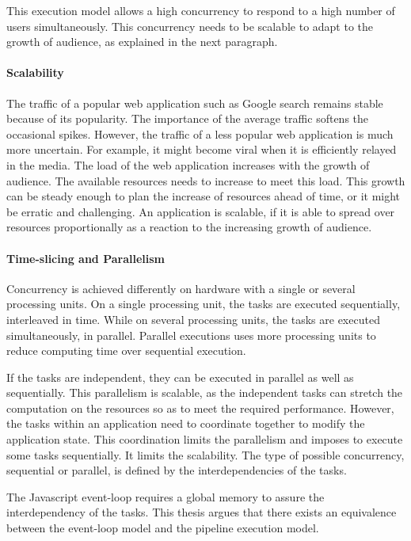 This execution model allows a high concurrency to respond to a high number of users simultaneously.
This concurrency needs to be scalable to adapt to the growth of audience, as explained in the next paragraph.

\paragraph{Scalability}

The traffic of a popular web application such as Google search remains stable because of its popularity.
The importance of the average traffic softens the occasional spikes.
However, the traffic of a less popular web application is much more uncertain.
For example, it might become viral when it is efficiently relayed in the media.
The load of the web application increases with the growth of audience.
The available resources needs to increase to meet this load.
This growth can be steady enough to plan the increase of resources ahead of time, or it might be erratic and challenging.
An application is scalable, if it is able to spread over resources proportionally as a reaction to the increasing growth of audience.

\paragraph{Time-slicing and Parallelism}

Concurrency is achieved differently on hardware with a single or several processing units.
On a single processing unit, the tasks are executed sequentially, interleaved in time.
While on several processing units, the tasks are executed simultaneously, in parallel.
Parallel executions uses more processing units to reduce computing time over sequential execution.

If the tasks are independent, they can be executed in parallel as well as sequentially.
This parallelism is scalable, as the independent tasks can stretch the computation on the resources so as to meet the required performance.
However, the tasks within an application need to coordinate together to modify the application state.
This coordination limits the parallelism and imposes to execute some tasks sequentially.
It limits the scalability.
The type of possible concurrency, sequential or parallel, is defined by the interdependencies of the tasks.

The Javascript event-loop requires a global memory to assure the interdependency of the tasks.
This thesis argues that there exists an equivalence between the event-loop model and the pipeline execution model.

